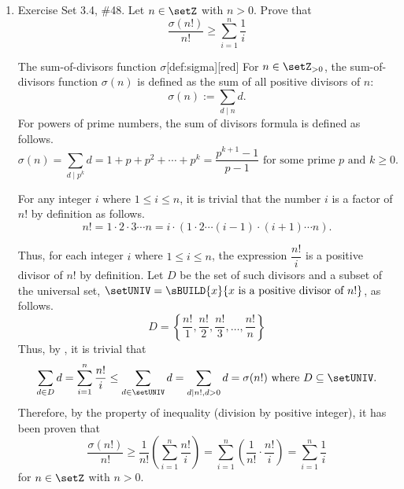 \begin{enumerate}
  \newpage

  \item Exercise Set 3.4, \#48.
  Let $n \in \setZ$ with $n>0$. Prove that
  $$
  \frac{\sigma(n!)}{n!} \geq \sum_{i=1}^n \frac{1}{i}
  $$
  \begin{define}{The sum-of-divisors function $\sigma$}[def:sigma][red]
  For $n\in\setZ_{>0}$, the sum-of-divisors function $\sigma(n)$ is defined as the sum of all positive divisors of $n$:
  \[
  \sigma(n):=\sum_{d\mid n} d.
  \]
  For powers of prime numbers, the sum of divisors formula is defined as follows.
  \[
  \sigma(n) =\sum_{d\mid p^k} d = 1 + p + p^2 + \cdots + p^k = \frac{p^{k+1}-1}{p-1} \text{ for some prime } p \text{ and } k\geq 0.
  \]
  \end{define}
  \begin{subprove}
    For any integer $i$ where $1 \le i \le n$, it is trivial that the number $i$ is a factor 
    of $n!$ by definition as follows.
    \[
    n! = 1 \cdot 2 \cdot 3 \cdots n = i \cdot (1 \cdot 2 \cdots (i-1) \cdot (i+1) \cdots n).
    \]

    Thus, for each integer $i$ where $1 \le i \le n$, the expression $\dfrac{n!}{i}$ is a 
    positive divisor of $n!$ by definition. Let $D$ be the set of such divisors and a 
    subset of the universal set, $\setUNIV = \sBUILD{x}{x\text{ is a positive divisor of }n!}$, as follows.
    \[
      D = \left\{ \frac{n!}{1}, \frac{n!}{2}, \frac{n!}{3}, \ldots, \frac{n!}{n} \right\}
    \]
    Thus, by , it is trivial that
    \[
      \sum_{d \in D} d = \sum_{i=1}^n \frac{n!}{i} \leq \sum_{d \in \setUNIV} d = \sum_{d\mid n!, d>0} d =\sigma(n!)\text{ where }D \subseteq \setUNIV.
    \]
    Therefore, by the property of inequality (division by positive integer), it has been proven that
    \[
    \frac{\sigma(n!)}{n!} 
    \geq \frac{1}{n!} \left( \sum_{i=1}^n \frac{n!}{i} \right) 
    = \sum_{i=1}^n \left( \frac{1}{n!} \cdot \frac{n!}{i} \right) 
    = \sum_{i=1}^n \frac{1}{i}
    \]
    for $n \in \setZ$ with $n>0$.
  \end{subprove}





  \newpage


\end{enumerate}
